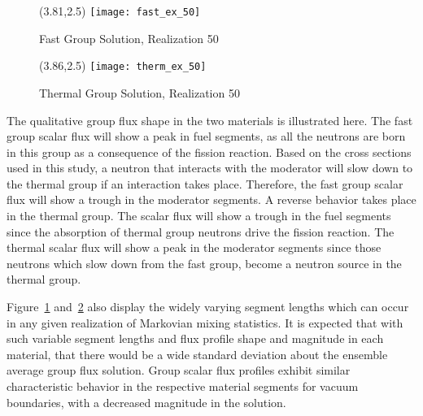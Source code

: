	\vspace{0.2in}
	\begin{figure}[htbp]
		\begin{center}
			\begin{minipage}[t]{3.81in}
			\begin{picture}(3.81,2.5)
	            	{\texttt{[image: fast\_ex\_50]}}
			\end{picture}
			\caption{\label{fig:Sol-50-Fast} Fast Group Solution, Realization 50}
			\end{minipage} %
		\end{center}
	\end{figure}	
	\vspace{-0.25in} 
	\vspace{0.2in}
	\begin{figure}[htbp]
		\begin{center}
			\begin{minipage}[t]{3.86in}
			\begin{picture}(3.86,2.5)
	            	{\texttt{[image: therm\_ex\_50]}}
			\end{picture}
			\caption{\label{fig:Sol-50-Therm} Thermal Group Solution, Realization 50}
			\end{minipage} %
		\end{center}
	\end{figure}	
	\vspace{-0.25in}
\noindent The qualitative group flux shape in the two materials is illustrated here.  The fast group 
	scalar flux will show a peak in fuel segments, as all the neutrons are born in this group as a
	consequence of the fission reaction.  Based on the cross sections used in this study, a neutron
	that interacts with the moderator will slow down to the thermal group if an interaction takes place.
	Therefore, the fast group scalar flux will show a trough in the moderator segments.  A reverse
	behavior takes place in the thermal group.  The scalar flux will show a trough in the fuel
	segments since the absorption of thermal group neutrons drive the fission reaction.  The 
	thermal scalar flux will show a peak in the moderator segments since those neutrons which 
	slow down from the fast group, become a neutron source in the thermal group. 
 
 \noindent
 	\indent Figure~\ref{fig:Sol-50-Fast} and~\ref{fig:Sol-50-Therm} also display the widely
	varying segment lengths which can occur in any given realization of Markovian mixing statistics.
	It is expected that with such variable segment lengths and flux profile shape and magnitude in
	each material, that there would be a wide standard deviation about the ensemble average
	group flux solution.  Group scalar flux profiles exhibit similar characteristic behavior in the
	respective material segments for vacuum boundaries, with a decreased magnitude in the
	solution.  
	
